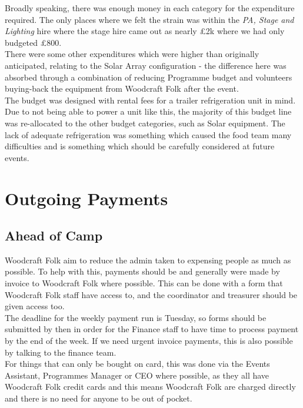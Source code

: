 Broadly speaking, there was enough money in each category for the expenditure required. The only places where we felt the strain was within the \textit{PA, Stage and Lighting} hire where the stage hire came out as nearly \pounds2k where we had only budgeted \pounds800.\\

There were some other expenditures which were higher than originally anticipated, relating to the Solar Array configuration - the difference here was absorbed through a combination of reducing Programme budget and volunteers buying-back the equipment from Woodcraft Folk after the event.\\

The budget was designed with rental fees for a trailer refrigeration unit in mind. Due to not being able to power a unit like this, the majority of this budget line was re-allocated to the other budget categories, such as Solar equipment. The lack of adequate refrigeration was something which caused the food team many difficulties and is something which should be carefully considered at future events.

\section{Outgoing Payments}
\subsection{Ahead of Camp}
Woodcraft Folk aim to reduce the admin taken to expensing people as much as possible. To help with this, payments should be and generally were made by invoice to Woodcraft Folk where possible. This can be done with a form that Woodcraft Folk staff have access to, and the coordinator and treasurer should be given access too. \\
The deadline for the weekly payment run is Tuesday, so  forms should be submitted by then in order for the Finance staff to have time to process payment by the end of the week. If we need urgent invoice payments, this is also possible by talking to the finance team.\\ 

For things that can only be bought on card, this was done via the Events Assistant, Programmes Manager or CEO where possible, as they all have Woodcraft Folk credit cards and this means Woodcraft Folk are charged directly and there is no need for anyone to be out of pocket.\\

